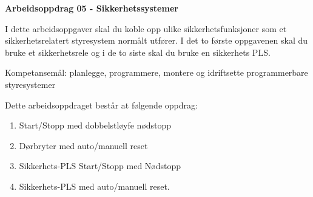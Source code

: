 
\noindent
{\bf Arbeidsoppdrag 05 - Sikkerhetssystemer}

\vskip 5pt

I dette arbeidsoppgaver skal du koble opp ulike sikkerhetsfunksjoner som et sikkerhetsrelatert styresystem normålt utfører. I det to første oppgavenen skal du bruke et sikkerhetsrele og i de to siste skal du bruke en sikkerhets PLS. 

Kompetansemål:
planlegge, programmere, montere og idriftsette programmerbare styresystemer

Dette arbeidsoppdraget består at følgende oppdrag:
\begin{enumerate}
	\item Start/Stopp med dobbelstløyfe nødstopp
	\item Dørbryter med auto/manuell reset
	\item Sikkerhets-PLS Start/Stopp med Nødstopp
	\item Sikkerhets-PLS med auto/manuell reset. 
\end{enumerate}



